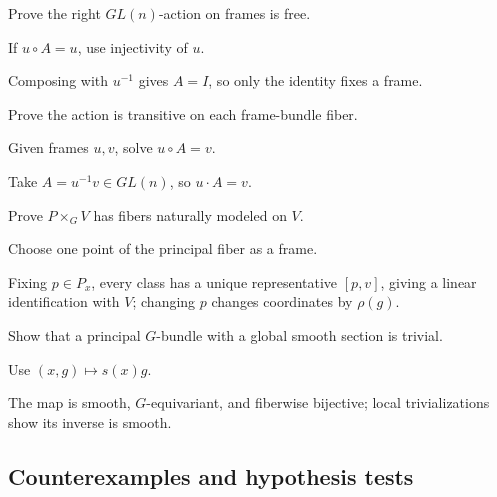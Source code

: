 \begin{exercise}\label{exr:vii08-ped-06}
Prove the right \(GL(n)\)-action on frames is free.
\end{exercise}
\begin{hint}
If \(u\circ A=u\), use injectivity of \(u\).
\end{hint}
\begin{solution}
Composing with \(u^{-1}\) gives \(A=I\), so only the identity fixes a frame.
\end{solution}

\begin{exercise}\label{exr:vii08-ped-07}
Prove the action is transitive on each frame-bundle fiber.
\end{exercise}
\begin{hint}
Given frames \(u,v\), solve \(u\circ A=v\).
\end{hint}
\begin{solution}
Take \(A=u^{-1}v\in GL(n)\), so \(u\cdot A=v\).
\end{solution}

\begin{exercise}\label{exr:vii08-ped-08}
Prove \(P\times_GV\) has fibers naturally modeled on \(V\).
\end{exercise}
\begin{hint}
Choose one point of the principal fiber as a frame.
\end{hint}
\begin{solution}
Fixing \(p\in P_x\), every class has a unique representative \([p,v]\), giving a linear identification with \(V\); changing \(p\) changes coordinates by \(\rho(g)\).
\end{solution}

\begin{exercise}\label{exr:vii08-ped-09}
Show that a principal \(G\)-bundle with a global smooth section is trivial.
\end{exercise}
\begin{hint}
Use \((x,g)\mapsto s(x)g\).
\end{hint}
\begin{solution}
The map is smooth, \(G\)-equivariant, and fiberwise bijective; local trivializations show its inverse is smooth.
\end{solution}

\subsection*{Counterexamples and hypothesis tests}

